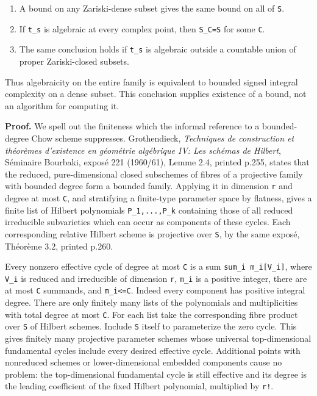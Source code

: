 \documentclass[11pt,a4paper]{article}
\providecommand{\tightlist}{\setlength{\itemsep}{0pt}\setlength{\parskip}{0pt}}
\theoremstyle{definition}
\begin{document}
\begin{enumerate}
\def\labelenumi{\arabic{enumi}.}
\tightlist
\item
  A bound on any Zariski-dense subset gives the same bound on all of
  \texttt{S}.
\item
  If \texttt{t\_s} is algebraic at every complex point, then
  \texttt{S\_C=S} for some \texttt{C}.
\item
  The same conclusion holds if \texttt{t\_s} is algebraic outside a
  countable union of proper Zariski-closed subsets.
\end{enumerate}

Thus algebraicity on the entire family is equivalent to bounded signed
integral complexity on a dense subset. This conclusion supplies
existence of a bound, not an algorithm for computing it.

\textbf{Proof.} We spell out the finiteness which the informal reference
to a bounded-degree Chow scheme suppresses. Grothendieck,
\emph{Techniques de construction et théorèmes d'existence en géométrie
algébrique IV: Les schémas de Hilbert}, Séminaire Bourbaki, exposé 221
(1960/61), Lemme 2.4, printed p.255, states that the reduced,
pure-dimensional closed subschemes of fibres of a projective family with
bounded degree form a bounded family. Applying it in dimension
\texttt{r} and degree at most \texttt{C}, and stratifying a finite-type
parameter space by flatness, gives a finite list of Hilbert polynomials
\texttt{P\_1,...,P\_k} containing those of all reduced irreducible
subvarieties which can occur as components of these cycles. Each
corresponding relative Hilbert scheme is projective over \texttt{S}, by
the same exposé, Théorème 3.2, printed p.260.

Every nonzero effective cycle of degree at most \texttt{C} is a sum
\texttt{sum\_i\ m\_i{[}V\_i{]}}, where \texttt{V\_i} is reduced and
irreducible of dimension \texttt{r}, \texttt{m\_i} is a positive
integer, there are at most \texttt{C} summands, and
\texttt{m\_i\textless{}=C}. Indeed every component has positive integral
degree. There are only finitely many lists of the polynomials and
multiplicities with total degree at most \texttt{C}. For each list take
the corresponding fibre product over \texttt{S} of Hilbert schemes.
Include \texttt{S} itself to parameterize the zero cycle. This gives
finitely many projective parameter schemes whose universal
top-dimensional fundamental cycles include every desired effective
cycle. Additional points with nonreduced schemes or lower-dimensional
embedded components cause no problem: the top-dimensional fundamental
cycle is still effective and its degree is the leading coefficient of
the fixed Hilbert polynomial, multiplied by \texttt{r!}.
\end{document}
